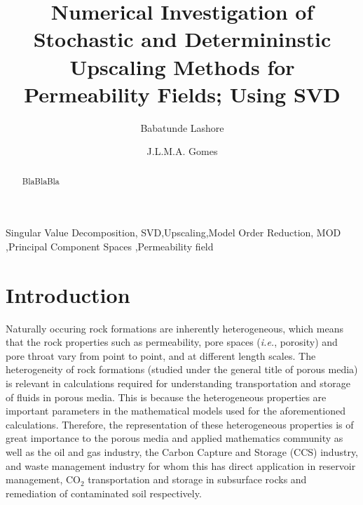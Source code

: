 \documentclass[preprint,authoryear,12pt]{elsarticle}
\begin{document}
\begin{frontmatter}



  \title{ Numerical Investigation of Stochastic and Determininstic Upscaling Methods for Permeability Fields; Using SVD}
\author[UoA]{Babatunde Lashore} \author[UoA]{J.L.M.A. Gomes}
\address[UoA]{Mechanics of Fluids, Soils \& Structures Group, School of Engineering, University of Aberdeen, UK}


\begin{abstract}
  BlaBlaBla
\end{abstract}



\begin{keyword} %
Singular Value Decomposition, SVD\sep Upscaling\sep Model Order Reduction, MOD \sep  Principal Component Spaces \sep Permeability field
\end{keyword}
 
\end{frontmatter}

\section{Introduction}\label{section:intro}
Naturally occuring rock formations are inherently heterogeneous, which means that the rock properties such as permeability, pore spaces ({\it i.e.}, porosity) and pore throat vary from point to point, and at different length scales. The heterogeneity of rock formations (studied under the general title of porous media) is relevant in calculations required for understanding transportation and storage of fluids in porous media. This is because the heterogeneous properties are important parameters in the mathematical models used for the aforementioned calculations. Therefore, the representation of these heterogeneous properties is of great importance to the porous media and applied mathematics community as well as the oil and gas industry, the Carbon Capture and Storage (CCS) industry, and waste management industry for whom this has direct application in reservoir management, CO$_2$ transportation and storage in subsurface rocks and remediation of contaminated soil respectively.
\end{document}
